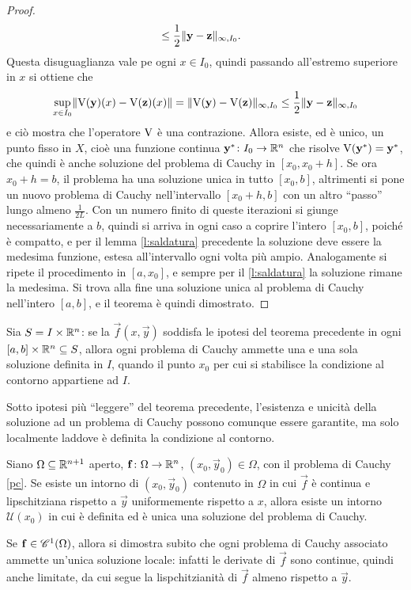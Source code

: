 \begin{proof}
\begin{align*}
	&\leq\frac12\norm{\vec y-\vec z}_{\infty,I_0}.
\end{align*}
Questa disuguaglianza vale pe ogni $x\in I_0$, quindi passando all'estremo superiore in $x$ si ottiene che
\[
\sup_{x\in I_0}\norm{\volterra(\vec y)(x)-\volterra(\vec z)(x)}=\norm{\volterra(\vec y)-\volterra(\vec z)}_{\infty,I_0}\leq\frac12\norm{\vec y-\vec z}_{\infty,I_0}
\]
e ciò mostra che l'operatore $\volterra$ è una contrazione. Allora esiste, ed è unico, un punto fisso in $X$, cioè una funzione continua $\vec y^*\colon I_0\to\R^n$ che risolve $\volterra(\vec y^*)=\vec y^*$, che quindi è anche soluzione del problema di Cauchy in $[x_0,x_0+h]$.
Se ora $x_0+h=b$, il problema ha una soluzione unica in tutto $[x_0,b]$, altrimenti si pone un nuovo problema di Cauchy nell'intervallo $[x_0+h,b]$ con un altro ``passo'' lungo almeno $\frac1{2L}$. Con un numero finito di queste iterazioni si giunge necessariamente a $b$, quindi si arriva in ogni caso a coprire l'intero $[x_0,b]$, poiché è compatto, e per il lemma \ref{l:saldatura} precedente la soluzione deve essere la medesima funzione, estesa all'intervallo ogni volta più ampio. Analogamente si ripete il procedimento in $[a,x_0]$, e sempre per il \ref{l:saldatura} la soluzione rimane la medesima. Si trova alla fine una soluzione unica al problema di Cauchy nell'intero $[a,b]$, e il teorema è quindi dimostrato.
\end{proof}

\begin{corollario}
Sia $S=I\times\R^n$: se la $\vec f(x,\vec y)$ soddisfa le ipotesi del teorema precedente in ogni $[a,b]\times\R^n\subseteq S$, allora ogni problema di Cauchy ammette una e una sola soluzione definita in $I$, quando il punto $x_0$ per cui si stabilisce la condizione al contorno appartiene ad $I$.
\end{corollario}

Sotto ipotesi più ``leggere'' del teorema precedente, l'esistenza e unicità della soluzione ad un problema di Cauchy possono comunque essere garantite, ma solo localmente laddove è definita la condizione al contorno.
\begin{teorema} \label{t:E-locale}
Siano $\Omega\subseteq\R^{n+1}$ aperto, $\vec f\colon\Omega\to\R^n$, $(x_0,\vec y_0)\in\Omega$, con il problema di Cauchy \eqref{pc}. Se esiste un intorno di $(x_0,\vec y_0)$ contenuto in $\Omega$ in cui $\vec f$ è continua e lipschitziana rispetto a $\vec y$ uniformemente rispetto a $x$, allora esiste un intorno $\mathcal U(x_0)$ in cui è definita ed è unica una soluzione del problema di Cauchy.
\end{teorema}
Se $\vec f\in\cont[1]{\Omega}$, allora si dimostra subito che ogni problema di Cauchy associato ammette un'unica soluzione locale: infatti le derivate di $\vec f$ sono continue, quindi anche limitate, da cui segue la lispchitzianità di $\vec f$ almeno rispetto a $\vec y$.

